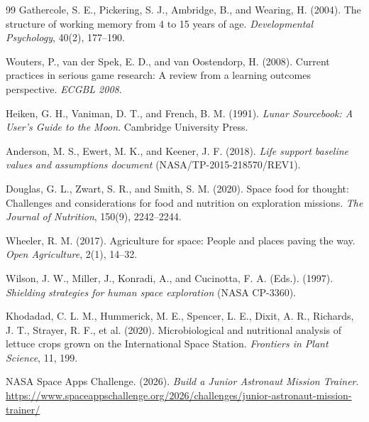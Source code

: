 \documentclass[11pt,a4paper]{article}
\begin{document}
\begin{thebibliography}{99}
Gathercole, S. E., Pickering, S. J., Ambridge, B., and Wearing, H. (2004).
\newblock The structure of working memory from 4 to 15 years of age.
\newblock \emph{Developmental Psychology}, 40(2), 177--190.

Wouters, P., van der Spek, E. D., and van Oostendorp, H. (2008).
\newblock Current practices in serious game research: A review from a learning outcomes perspective.
\newblock \emph{ECGBL 2008}.

Heiken, G. H., Vaniman, D. T., and French, B. M. (1991).
\newblock \emph{Lunar Sourcebook: A User's Guide to the Moon}. Cambridge University Press.

Anderson, M. S., Ewert, M. K., and Keener, J. F. (2018).
\newblock \emph{Life support baseline values and assumptions document} (NASA/TP-2015-218570/REV1).

Douglas, G. L., Zwart, S. R., and Smith, S. M. (2020).
\newblock Space food for thought: Challenges and considerations for food and nutrition on exploration missions.
\newblock \emph{The Journal of Nutrition}, 150(9), 2242--2244.

Wheeler, R. M. (2017).
\newblock Agriculture for space: People and places paving the way.
\newblock \emph{Open Agriculture}, 2(1), 14--32.

Wilson, J. W., Miller, J., Konradi, A., and Cucinotta, F. A. (Eds.). (1997).
\newblock \emph{Shielding strategies for human space exploration} (NASA CP-3360).

Khodadad, C. L. M., Hummerick, M. E., Spencer, L. E., Dixit, A. R., Richards, J. T., Strayer, R. F., et al. (2020).
\newblock Microbiological and nutritional analysis of lettuce crops grown on the International Space Station.
\newblock \emph{Frontiers in Plant Science}, 11, 199.

NASA Space Apps Challenge. (2026).
\newblock \emph{Build a Junior Astronaut Mission Trainer}.
\newblock \url{https://www.spaceappschallenge.org/2026/challenges/junior-astronaut-mission-trainer/}

\end{thebibliography}
\end{document}
